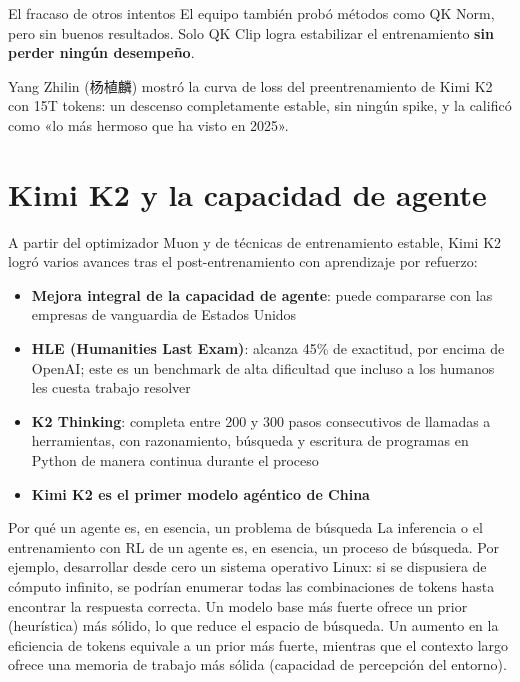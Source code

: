 \documentclass[a4paper]{article}
\begin{document}
\begin{warningbox}{El fracaso de otros intentos}
El equipo también probó métodos como QK Norm, pero sin buenos resultados. Solo QK Clip logra estabilizar el entrenamiento \textbf{sin perder ningún desempeño}.
\end{warningbox}

Yang Zhilin (杨植麟) mostró la curva de loss del preentrenamiento de Kimi K2 con 15T tokens: un descenso completamente estable, sin ningún spike, y la calificó como «lo más hermoso que ha visto en 2025».

\section{Kimi K2 y la capacidad de agente}

A partir del optimizador Muon y de técnicas de entrenamiento estable, Kimi K2 logró varios avances tras el post-entrenamiento con aprendizaje por refuerzo:

\begin{itemize}
\item \textbf{Mejora integral de la capacidad de agente}: puede compararse con las empresas de vanguardia de Estados Unidos
\item \textbf{HLE (Humanities Last Exam)}: alcanza 45\% de exactitud, por encima de OpenAI; este es un benchmark de alta dificultad que incluso a los humanos les cuesta trabajo resolver
\item \textbf{K2 Thinking}: completa entre 200 y 300 pasos consecutivos de llamadas a herramientas, con razonamiento, búsqueda y escritura de programas en Python de manera continua durante el proceso
\item \textbf{Kimi K2 es el primer modelo agéntico de China}
\end{itemize}

\begin{knowledgebox}{Por qué un agente es, en esencia, un problema de búsqueda}
La inferencia o el entrenamiento con RL de un agente es, en esencia, un proceso de búsqueda. Por ejemplo, desarrollar desde cero un sistema operativo Linux: si se dispusiera de cómputo infinito, se podrían enumerar todas las combinaciones de tokens hasta encontrar la respuesta correcta. Un modelo base más fuerte ofrece un prior (heurística) más sólido, lo que reduce el espacio de búsqueda. Un aumento en la eficiencia de tokens equivale a un prior más fuerte, mientras que el contexto largo ofrece una memoria de trabajo más sólida (capacidad de percepción del entorno).
\end{knowledgebox}
\end{document}
